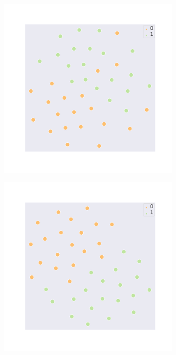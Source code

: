 \begin{figure}[h]
     \centering
     \begin{subfigure}[b]{0.4\textwidth}
         \centering
         \includegraphics[width=\textwidth,trim=2.55cm 3cm 2.6cm 2.6cm, clip]{chapters/assets/samptr_extra/cnn_val_emb.pdf}
     \end{subfigure}
     \hspace{1cm}
     \begin{subfigure}[b]{0.4\textwidth}
         \centering
         \includegraphics[width=\textwidth, trim=2.55cm 3cm 2.6cm 2.6cm, clip]{chapters/assets/samptr_extra/gnn_val_emb.pdf}

\end{subfigure}
\end{figure}
